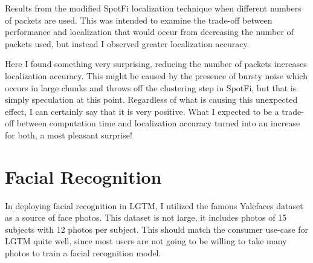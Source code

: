 \documentclass[12pt]{report}
\begin{document}
\begin{table}[p]
    \caption{Results from the modified SpotFi localization technique when different numbers of packets are used. This was intended to examine the trade-off between performance and localization that would occur from decreasing the number of packets used, but instead I observed greater localization accuracy.}
    \label{table: sampling-data-table}
    \begin{subfigure}[b]{0.3\textwidth}
        \begin{center}
            \scalebox{0.7}{}
        \end{center}
    \end{subfigure}
    \par\bigskip
    \begin{subfigure}[b]{0.3\textwidth}
        \begin{center}
            \scalebox{0.7}{}
        \end{center}
    \end{subfigure}
    \par\bigskip
    \begin{subfigure}[b]{0.3\textwidth}
        \begin{center}
            \scalebox{0.7}{}
        \end{center}
    \end{subfigure}
    \par\bigskip
\end{table}

Here I found something very surprising, reducing the number of packets increases localization accuracy. This might be caused by the presence of bursty noise which occurs in large chunks and throws off the clustering step in SpotFi, but that is simply speculation at this point. Regardless of what is causing this unexpected effect, I can certainly say that it is very positive. What I expected to be a trade-off between computation time and localization accuracy turned into an increase for both, a most pleasant surprise! \par

\section{Facial Recognition}
In deploying facial recognition in LGTM, I utilized the famous Yalefaces \cite{FisherfacesBelhumeur1997} dataset as a source of face photos. This dataset is not large, it includes photos of 15 subjects with 12 photos per subject. This should match the consumer use-case for LGTM quite well, since most users are not going to be willing to take many photos to train a facial recognition model. \par
\end{document}
